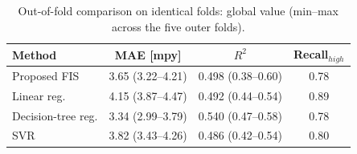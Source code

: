\begin{table}[htb!]
\centering
\footnotesize
\setlength{\tabcolsep}{4pt}
\caption{Out-of-fold comparison on identical folds: global value (min--max across the five outer folds).}
\label{tab:comparison}
\begin{tabular}{@{}lccc@{}}
\toprule
Method & MAE [mpy] & $R^2$ & Recall$_{high}$ \\
\midrule
\midrule
Proposed FIS & 3.65 (3.22--4.21) & 0.498 (0.38--0.60) & 0.78 \\
Linear reg. & 4.15 (3.87--4.47) & 0.492 (0.44--0.54) & 0.89 \\
Decision-tree reg. & 3.34 (2.99--3.79) & 0.540 (0.47--0.58) & 0.78 \\
SVR & 3.82 (3.43--4.26) & 0.486 (0.42--0.54) & 0.80 \\
\bottomrule
\end{tabular}
\end{table}

